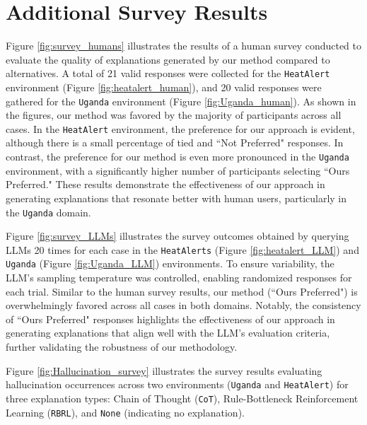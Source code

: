 \newpage

\section{Additional Survey Results}
Figure \ref{fig:survey_humans} illustrates the results of a human survey conducted to evaluate the quality of explanations generated by our method compared to alternatives. A total of 21 valid responses were collected for the \texttt{HeatAlert} environment (Figure \ref{fig:heatalert_human}), and 20 valid responses were gathered for the \texttt{Uganda} environment (Figure \ref{fig:Uganda_human}).
As shown in the figures, our method was favored by the majority of participants across all cases. In the \texttt{HeatAlert} environment, the preference for our approach is evident, although there is a small percentage of tied and ``Not Preferred" responses. In contrast, the preference for our method is even more pronounced in the \texttt{Uganda} environment, with a significantly higher number of participants selecting ``Ours Preferred." These results demonstrate the effectiveness of our approach in generating explanations that resonate better with human users, particularly in the \texttt{Uganda} domain.




Figure \ref{fig:survey_LLMs} illustrates the survey outcomes obtained by querying LLMs 20 times for each case in the \texttt{HeatAlerts} (Figure \ref{fig:heatalert_LLM}) and \texttt{Uganda} (Figure \ref{fig:Uganda_LLM}) environments. To ensure variability, the LLM's sampling temperature was controlled, enabling randomized responses for each trial. Similar to the human survey results, our method (``Ours Preferred") is overwhelmingly favored across all cases in both domains. Notably, the consistency of ``Ours Preferred" responses highlights the effectiveness of our approach in generating explanations that align well with the LLM's evaluation criteria, further validating the robustness of our methodology.





Figure \ref{fig:Hallucination_survey} illustrates the survey results evaluating hallucination occurrences across two environments (\texttt{Uganda} and \texttt{HeatAlert}) for three explanation types: Chain of Thought (\texttt{CoT}), Rule-Bottleneck Reinforcement Learning (\texttt{RBRL}), and \texttt{None} (indicating no explanation).

